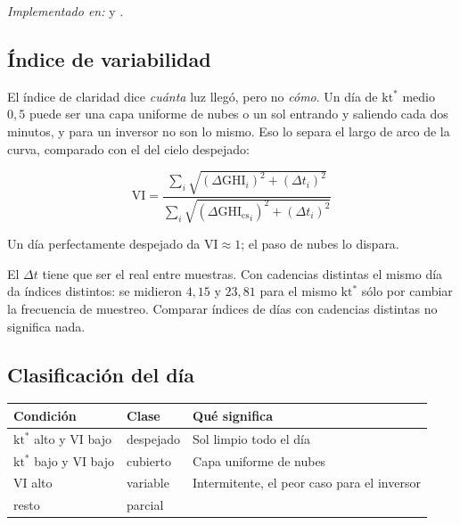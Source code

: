 \documentclass[11pt,a4paper]{article}
\begin{document}
\emph{Implementado en:}  y .

\subsection{Índice de variabilidad}

El índice de claridad dice \emph{cuánta} luz llegó, pero no \emph{cómo}. Un día de
$\mathrm{kt^*}$ medio $0{,}5$ puede ser una capa uniforme de nubes o un sol entrando y
saliendo cada dos minutos, y para un inversor no son lo mismo. Eso lo separa el largo de
arco de la curva, comparado con el del cielo despejado:

\begin{equation*}
  \mathrm{VI} = \frac{\sum_i \sqrt{(\Delta \mathrm{GHI}_i)^2 + (\Delta t_i)^2}}
                     {\sum_i \sqrt{(\Delta \mathrm{GHI_{cs}}_i)^2 + (\Delta t_i)^2}}
\end{equation*}

Un día perfectamente despejado da $\mathrm{VI} \approx 1$; el paso de nubes lo dispara.

\begin{aviso}[title={El índice mide la curva, no el registrador}]
El $\Delta t$ tiene que ser el real entre muestras. Con cadencias distintas el mismo día
da índices distintos: se midieron $4{,}15$ y $23{,}81$ para el mismo $\mathrm{kt^*}$ sólo
por cambiar la frecuencia de muestreo. Comparar índices de días con cadencias distintas
no significa nada.
\end{aviso}

\subsection{Clasificación del día}

\begin{center}
\small
\begin{tabular}{@{}p{46mm}p{40mm}p{50mm}@{}}
\toprule
\textbf{Condición} & \textbf{Clase} & \textbf{Qué significa} \\
\midrule
$\mathrm{kt^*}$ alto y $\mathrm{VI}$ bajo & despejado & Sol limpio todo el día \\
$\mathrm{kt^*}$ bajo y $\mathrm{VI}$ bajo & cubierto & Capa uniforme de nubes \\
$\mathrm{VI}$ alto & variable & Intermitente, el peor caso para el inversor \\
resto & parcial & \\
\bottomrule
\end{tabular}
\end{center}
\end{document}
